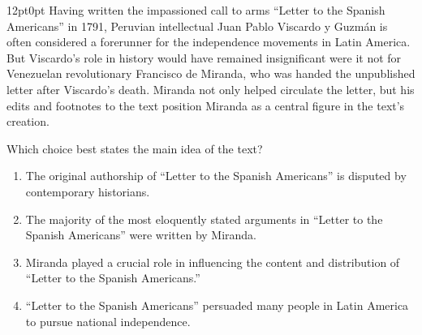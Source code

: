 \documentclass[11pt, twocolumn]{article}
\newcounter{questionnum}
\begin{document}
\vspace{6pt}\noindent
\begin{minipage}{\columnwidth}\raggedright
\noindent{}\par\vspace{8pt}
\begin{adjustwidth}{12pt}{0pt}
Having written the impassioned call to arms ``Letter to the Spanish Americans'' in 1791, Peruvian intellectual Juan Pablo Viscardo y Guzmán is often considered a forerunner for the independence movements in Latin America. But Viscardo's role in history would have remained insignificant were it not for Venezuelan revolutionary Francisco de Miranda, who was handed the unpublished letter after Viscardo's death. Miranda not only helped circulate the letter, but his edits and footnotes to the text position Miranda as a central figure in the text's creation.
\vspace{6pt}

Which choice best states the main idea of the text?
\begin{enumerate}[label=\Alph*),leftmargin=18pt,topsep=3pt,itemsep=2pt]
  \item The original authorship of ``Letter to the Spanish Americans'' is disputed by contemporary historians.
  \item The majority of the most eloquently stated arguments in ``Letter to the Spanish Americans'' were written by Miranda.
  \item Miranda played a crucial role in influencing the content and distribution of ``Letter to the Spanish Americans.''
  \item ``Letter to the Spanish Americans'' persuaded many people in Latin America to pursue national independence.
\end{enumerate}
\end{adjustwidth}
\end{minipage}\par
\end{document}
